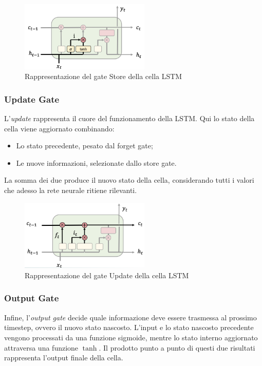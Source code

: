 \begin{figure}[!ht]
    \centering
    \includegraphics[width=0.55\textwidth]{figure/StoreLSTM.png}
    \caption{Rappresentazione del gate Store della cella LSTM}
    \label{fig:LSTMStore}
\end{figure}

\subsubsection{Update Gate}
L’\textit{update} rappresenta il cuore del funzionamento della LSTM. Qui lo stato della cella viene aggiornato combinando:
\begin{itemize}
    \item Lo stato precedente, pesato dal forget gate;
    \item Le nuove informazioni, selezionate dallo store gate.
\end{itemize}
La somma dei due produce il nuovo stato della cella, considerando tutti i valori che adesso la rete neurale ritiene rilevanti.

\begin{figure}[!ht]
    \centering
    \includegraphics[width=0.55\textwidth]{figure/UpdateLSTM.png}
    \caption{Rappresentazione del gate Update della cella LSTM}
    \label{fig:LSTMUpdate}
\end{figure}

\subsubsection{Output Gate}
Infine, l’\textit{output gate} decide quale informazione deve essere trasmessa al prossimo timestep, ovvero il nuovo stato nascosto. L'input e lo stato nascosto precedente vengono processati da una funzione sigmoide, mentre lo stato interno aggiornato attraversa una funzione $\tanh$. Il prodotto punto a punto di questi due risultati rappresenta l'output finale della cella.


